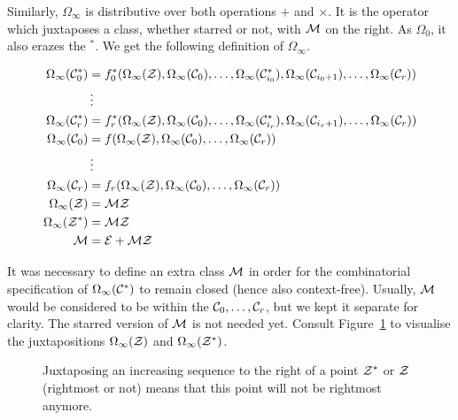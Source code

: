 \message{ !name(thesis.tex)}\documentclass[12pt, a4paper, twoside]{report}
\begin{document}
Similarly, $\Omega_\infty$ is distributive over both operations $+$ and $\times$. It is the operator which juxtaposes a class, whether starred or not, with $\mathcal{M}$ on the right. As $\Omega_0$, it also erazes the ${}^*$. We get the following definition of $\Omega_\infty$.

\begin{align*}
  \Omega_\infty(\mathcal{C}_0^*) &= f_0^*(\Omega_\infty(\mathcal{Z}),\Omega_\infty(\mathcal{C}_0),\ldots,\Omega_\infty(\mathcal{C}_{i_0}^*),\Omega_\infty(\mathcal{C}_{i_0+1}),\ldots,\Omega_\infty(\mathcal{C}_r))\\
       &\vdots\\
  \Omega_\infty(\mathcal{C}_r^*) &= f_r^*(\Omega_\infty(\mathcal{Z}),\Omega_\infty(\mathcal{C}_0),\ldots,\Omega_\infty(\mathcal{C}_{i_r}^*),\Omega_\infty(\mathcal{C}_{i_r+1}),\ldots,\Omega_\infty(\mathcal{C}_r))\\
  \Omega_\infty(\mathcal{C}_0) &= f(\Omega_\infty(\mathcal{Z}),\Omega_\infty(\mathcal{C}_0),\ldots,\Omega_\infty(\mathcal{C}_r))\\
       &\vdots\\
  \Omega_\infty(\mathcal{C}_r) &= f_r(\Omega_\infty(\mathcal{Z}),\Omega_\infty(\mathcal{C}_0),\ldots,\Omega_\infty(\mathcal{C}_r))\\
  \Omega_\infty(\mathcal{Z}) &= \mathcal{M}\mathcal{Z}\\
  \Omega_\infty(\mathcal{Z}^*) &= \mathcal{M}\mathcal{Z}\\
  \mathcal{M} &= \mathcal{E} + \mathcal{M}\mathcal{Z}\\
\end{align*}

It was necessary to define an extra class $\mathcal{M}$ in order for the combinatorial specification of $\Omega_\infty(\mathcal{C}^*)$ to remain closed (hence also context-free). Usually, $\mathcal{M}$ would be considered to be within the $\mathcal{C}_0,\ldots,\mathcal{C}_r$, but we kept it separate for clarity. The starred version of $\mathcal{M}$ is not needed yet. Consult Figure~\ref{fig:omega_infty} to visualise the juxtapositions $\Omega_\infty(\mathcal{Z})$ and $\Omega_\infty(\mathcal{Z}^*)$.

\begin{figure}[ht]
    \centering
    \caption{Juxtaposing an increasing sequence to the right of a point $\mathcal{Z}^*$ or $\mathcal{Z}$ (rightmost or not) means that this point will not be rightmost anymore.}
    \label{fig:omega_infty}
\end{figure}
\end{document}
